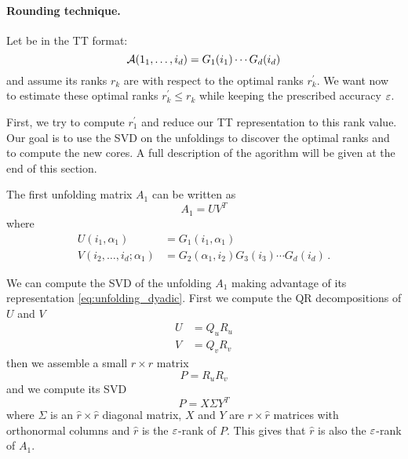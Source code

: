 \paragraph{Rounding technique.}
Let \A be in the TT format:
\begin{equation*}
  \mathcal{A}(1_1,\ldots,i_d) = G_1(i_1) \cdots G_d(i_d)
\end{equation*}
and assume its ranks $r_k$ are  with respect to the optimal ranks $r_k^\prime$. We want now to estimate these optimal ranks $r_k^\prime \le r_k$ while keeping the prescribed accuracy $\varepsilon$.

First, we try to compute $r_1^\prime$ and reduce our TT representation to this rank value. Our goal is to use the SVD on the unfoldings to discover the optimal ranks and to compute the new  cores. A full description of the agorithm will be given at the end of this section.%

The first unfolding matrix $A_1$ can be written as
\begin{equation} \label{eq:unfolding_dyadic}
  A_1 = UV^T
\end{equation}
where
\begin{equation} \label{def:UV}
  \begin{split}
    U(i_1,\alpha_1) &= G_1(i_1,\alpha_1)\\
    V(i_2,\ldots,i_d;\alpha_1) &= G_2(\alpha_1,i_2) G_3(i_3) \cdots G_d(i_d)\, .
  \end{split}
\end{equation}

We can compute the SVD of the unfolding $A_1$ making advantage of its representation \eqref{eq:unfolding_dyadic}. First we compute the QR decompositions of $U$ and $V$
\begin{equation*}
  \begin{split}
    U &= Q_u R_u\\
    V &= Q_v R_v
  \end{split}
\end{equation*}
then we assemble a small $r \times r$ matrix
\begin{equation*}
  P = R_u R_v
\end{equation*}
and we compute its SVD
\begin{equation*}
  P = X \Sigma Y^T
\end{equation*}
where $\Sigma$ is an $\hat{r}\times\hat{r}$ diagonal matrix, $X$ and $Y$ are $r \times \hat{r}$ matrices with orthonormal columns and $\hat{r}$ is the $\varepsilon$-rank of $P$. This gives that $\hat{r}$ is also the $\varepsilon$-rank of $A_1$.

